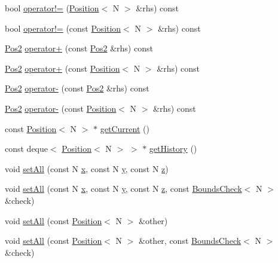 \begin{DoxyCompactItemize}
\item 
bool \hyperlink{struct_pos2_aabe6423f2d519d015c022fe8aedd2da9}{operator!=} (\hyperlink{struct_position}{Position}$<$ N $>$ \&rhs) const 
\item 
bool \hyperlink{struct_pos2_ae519d026266e7c63cede223ba78d68cf}{operator!=} (const \hyperlink{struct_position}{Position}$<$ N $>$ \&rhs) const 
\item 
\hyperlink{struct_pos2}{Pos2} \hyperlink{struct_pos2_a4965bba4823fd63b07ac6bf2288e354c}{operator+} (const \hyperlink{struct_pos2}{Pos2} \&rhs) const 
\item 
\hyperlink{struct_pos2}{Pos2} \hyperlink{struct_pos2_aa48d970911091f26baa779003392d654}{operator+} (const \hyperlink{struct_position}{Position}$<$ N $>$ \&rhs) const 
\item 
\hyperlink{struct_pos2}{Pos2} \hyperlink{struct_pos2_a8491e1dd62f258d99e607eeccb193124}{operator-\/} (const \hyperlink{struct_pos2}{Pos2} \&rhs) const 
\item 
\hyperlink{struct_pos2}{Pos2} \hyperlink{struct_pos2_a205a04ea6ab7f1d055a1f00c6602ae08}{operator-\/} (const \hyperlink{struct_position}{Position}$<$ N $>$ \&rhs) const 
\item 
const \hyperlink{struct_position}{Position}$<$ N $>$ $\ast$ \hyperlink{struct_pos2_a37c3a0998d4423f50fc09e074fc01522}{get\-Current} ()
\item 
const deque$<$ \hyperlink{struct_position}{Position}$<$ N $>$ $>$ $\ast$ \hyperlink{struct_pos2_ab9730d7c07f3aed458574ad9f63a7035}{get\-History} ()
\item 
void \hyperlink{struct_pos2_ae98c349465ab4c1085504649413f729b}{set\-All} (const N \hyperlink{struct_position_af908be922fc88d89d81be7d08d06f761}{x}, const N \hyperlink{struct_position_af434f54a0aad8bbfc3806ebdd197aa3b}{y}, const N \hyperlink{struct_position_ac430da98504c2d4fd685c0363d728474}{z})
\item 
void \hyperlink{struct_pos2_a5a26baf8ed6060892131a6e5341f0f3f}{set\-All} (const N \hyperlink{struct_position_af908be922fc88d89d81be7d08d06f761}{x}, const N \hyperlink{struct_position_af434f54a0aad8bbfc3806ebdd197aa3b}{y}, const N \hyperlink{struct_position_ac430da98504c2d4fd685c0363d728474}{z}, const \hyperlink{struct_bounds_check}{Bounds\-Check}$<$ N $>$ \&check)
\item 
void \hyperlink{struct_pos2_a65721a562cff5cbcbf023f4669783f32}{set\-All} (const \hyperlink{struct_position}{Position}$<$ N $>$ \&other)
\item 
void \hyperlink{struct_pos2_a830495035e3981da9e298db636b7f26a}{set\-All} (const \hyperlink{struct_position}{Position}$<$ N $>$ \&other, const \hyperlink{struct_bounds_check}{Bounds\-Check}$<$ N $>$ \&check)

\end{DoxyCompactItemize}
